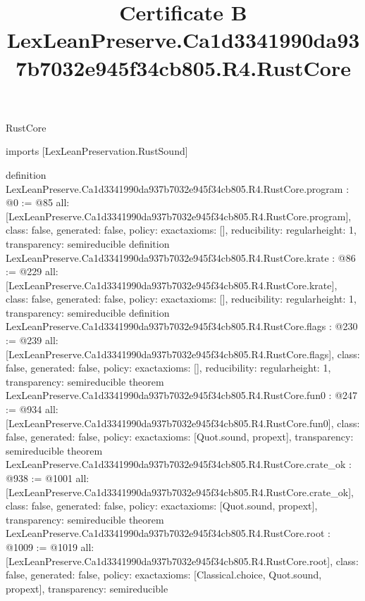 \begin{lexlean}{RustCore}
\title{Certificate B LexLeanPreserve.Ca1d3341990da937b7032e945f34cb805.R4.RustCore}
\begin{coremodule}
imports [LexLeanPreservation.RustSound]

definition LexLeanPreserve.Ca1d3341990da937b7032e945f34cb805.R4.RustCore.program : @0 := @85 {
  all: [LexLeanPreserve.Ca1d3341990da937b7032e945f34cb805.R4.RustCore.program],
  class: false,
  generated: false,
  policy: exact{axioms: []},
  reducibility: regular{height: 1},
  transparency: semireducible
}
definition LexLeanPreserve.Ca1d3341990da937b7032e945f34cb805.R4.RustCore.krate : @86 := @229 {
  all: [LexLeanPreserve.Ca1d3341990da937b7032e945f34cb805.R4.RustCore.krate],
  class: false,
  generated: false,
  policy: exact{axioms: []},
  reducibility: regular{height: 1},
  transparency: semireducible
}
definition LexLeanPreserve.Ca1d3341990da937b7032e945f34cb805.R4.RustCore.flags : @230 := @239 {
  all: [LexLeanPreserve.Ca1d3341990da937b7032e945f34cb805.R4.RustCore.flags],
  class: false,
  generated: false,
  policy: exact{axioms: []},
  reducibility: regular{height: 1},
  transparency: semireducible
}
theorem LexLeanPreserve.Ca1d3341990da937b7032e945f34cb805.R4.RustCore.fun0 : @247 := @934 {
  all: [LexLeanPreserve.Ca1d3341990da937b7032e945f34cb805.R4.RustCore.fun0],
  class: false,
  generated: false,
  policy: exact{axioms: [Quot.sound, propext]},
  transparency: semireducible
}
theorem LexLeanPreserve.Ca1d3341990da937b7032e945f34cb805.R4.RustCore.crate_ok : @938 := @1001 {
  all: [LexLeanPreserve.Ca1d3341990da937b7032e945f34cb805.R4.RustCore.crate_ok],
  class: false,
  generated: false,
  policy: exact{axioms: [Quot.sound, propext]},
  transparency: semireducible
}
theorem LexLeanPreserve.Ca1d3341990da937b7032e945f34cb805.R4.RustCore.root : @1009 := @1019 {
  all: [LexLeanPreserve.Ca1d3341990da937b7032e945f34cb805.R4.RustCore.root],
  class: false,
  generated: false,
  policy: exact{axioms: [Classical.choice, Quot.sound, propext]},
  transparency: semireducible
}


\end{coremodule}
\end{lexlean}
